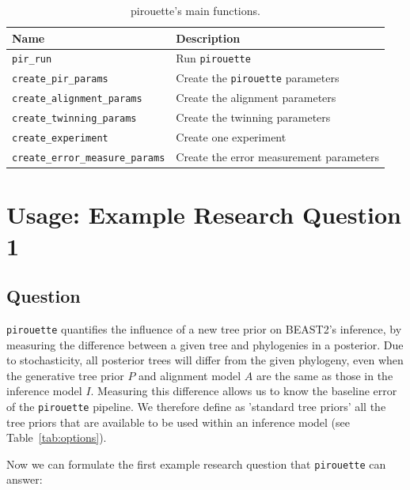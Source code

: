 \documentclass{article}
\begin{document}
\begin{table}[h]
\centering
\begin{tabular}{ | l | l | }
\hline
\textbf{Name} & \textbf{Description} \\
\hline
\verb;pir_run; & Run \verb;pirouette; \\
\verb;create_pir_params; & Create the \verb;pirouette; parameters \\
\hline
\verb;create_alignment_params; & Create the alignment parameters \\
\verb;create_twinning_params; & Create the twinning parameters \\
\verb;create_experiment; & Create one experiment \\
\verb;create_error_measure_params; & Create the error measurement parameters \\
\hline
\end{tabular}
\caption{pirouette's main functions.}
\label{tab:functions}
\end{table}

\section{Usage: Example Research Question 1}

\subsection{Question}

\verb;pirouette; quantifies the influence of a new tree prior on BEAST2's 
inference,
by measuring the difference between a given tree and 
phylogenies in a posterior. Due to stochasticity, all posterior trees
will differ from the given phylogeny, even when the generative tree
prior $\mathit{P}$ and alignment model $\mathit{A}$ are the same as 
those in the inference model $\mathit{I}$.
Measuring this difference allows us to know the baseline error
of the \verb;pirouette; pipeline. We therefore define as 'standard tree priors' 
all the tree priors that are available to be used within an inference model 
(see Table~\ref{tab:options}).

Now we can formulate the first example research question that \verb;pirouette; 
can answer:
\end{document}
